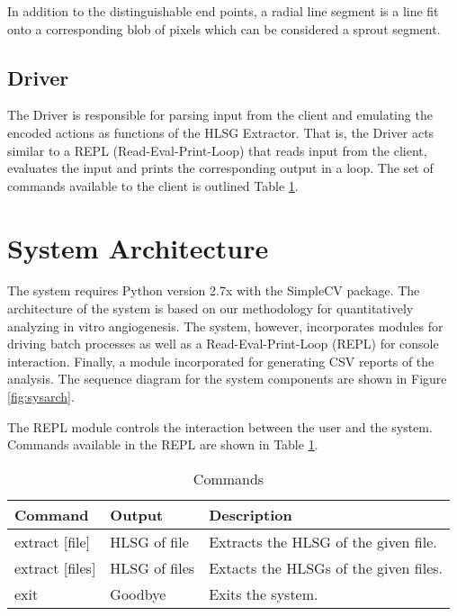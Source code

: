 \documentclass{sig-alternate}
\begin{document}
		In addition to the distinguishable end points, a radial line
		segment is a line fit onto a corresponding blob of pixels which can
		be considered a sprout segment.

	\subsection{Driver} %
	\label{sub:Driver}
		The Driver is responsible for parsing input from the client and emulating
		the encoded actions as functions of the HLSG Extractor. That is, the Driver
		acts similar to a REPL (Read-Eval-Print-Loop) that reads input from the
		client, evaluates the input and prints the corresponding output in a loop.
		The set of commands available to the client is outlined Table
		\ref{tab:commands}.

\section{System Architecture} %
\label{sec:System Architecture}
	The system requires Python version 2.7x with the SimpleCV package. The
	architecture of the system is based on our methodology for
	quantitatively analyzing in vitro angiogenesis. The system, however,
	incorporates modules for driving batch processes as well as a
	Read-Eval-Print-Loop (REPL) for console interaction. Finally, a module
	incorporated for generating CSV reports of the analysis. The sequence
	diagram for the system components are shown in Figure
	\ref{fig:sysarch}.
	\begin{figure*}[t!]
		\begin{centering}
			
		\end{centering}
		\caption{High-Level Architecture}
		\label{fig:sysarch}
	\end{figure*}

	The REPL module controls the interaction between the user and the
	system. Commands available in the REPL are shown in Table
	\ref{tab:commands}.
	\begin{table}[h!]
		\begin{tabular}{| l | l | p{4cm} |}
			\hline
			\textbf{Command} & \textbf{Output} & \textbf{Description} \\\hline
			extract [file] & HLSG of file & Extracts the HLSG of the given file. \\\hline
			extract [files] & HLSG of files & Extacts the HLSGs of the given files. \\\hline
			exit & Goodbye & Exits the system. \\\hline
		\end{tabular}
		\caption{Commands}
		\label{tab:commands}
	\end{table}
\end{document}
